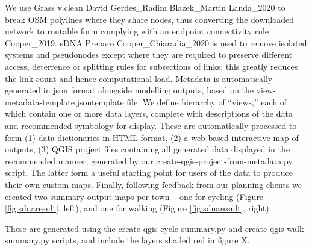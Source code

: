 \documentclass[galley]{jtlu-article-2col}
\begin{document}
We use Grass v.clean David Gerdes\_Radim Blazek\_Martin Landa\_2020 to break OSM polylines where they share nodes, thus converting the downloaded network to routable form complying with an endpoint connectivity rule Cooper\_2019. sDNA Prepare Cooper\_Chiaradia\_2020 is used to remove isolated systems and pseudonodes except where they are required to preserve different access, deterrence or splitting rules for subsections of links; this greatly reduces the link count and hence computational load.
Metadata is automatically generated in json format alongside modelling outputs, based on the view-metadata-template.jsontemplate file. We define hierarchy of ``views,'' each of which contain one or more data layers, complete with descriptions of the data and recommended symbology for display. These are automatically processed to form (1) data dictionaries in HTML format, (2) a web-based interactive map of outputs, (3) QGIS project files containing all generated data displayed in the recommended manner, generated by our create-qgis-project-from-metadata.py script. The latter form a useful starting point for users of the data to produce their own custom maps.
Finally, following feedback from our planning clients we created two summary output maps per town -- one for cycling (Figure \ref{fig:sdnaresult}, left), and one for walking (Figure \ref{fig:sdnaresult}, right).

These are generated using the create-qgis-cycle-summary.py and create-qgis-walk-summary.py scripts, and include the layers shaded red in figure X.
\end{document}
